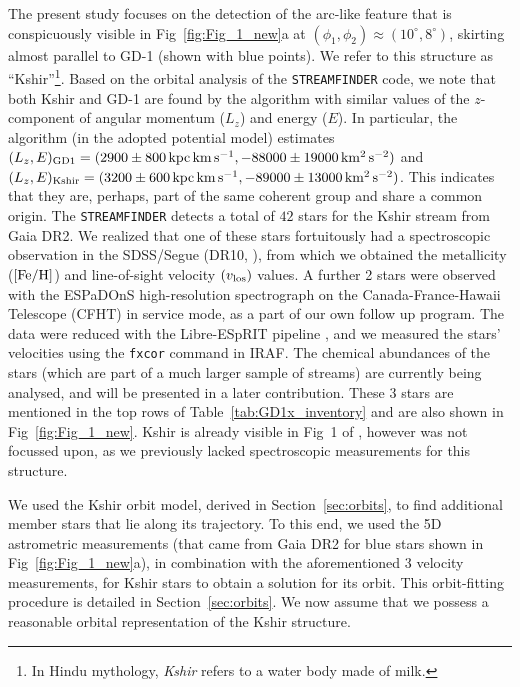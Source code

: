 \documentclass[apj]{emulateapj}
\def\km{{\rm\,km}}
\def\kms{{\rm\,km\,s^{-1}}}
\def\km2s2{{\rm\,km^{2}\,s^{-2}}}
\def\kpc{{\rm\,kpc}}
\def\deg{^\circ}
\begin{document}
The present study focuses on the detection of the arc-like feature that is conspicuously visible in Fig~\ref{fig:Fig_1_new}a at $(\phi_1,\phi_2) \approx (10\deg,8\deg)$, skirting almost parallel to GD-1 (shown with blue points). We refer to this structure as ``Kshir''\footnote{In Hindu mythology, {\it Kshir} refers to a water body made of milk.}. Based on the orbital analysis of the \texttt{STREAMFINDER} code, we note that both Kshir and GD-1 are found by the algorithm with similar values of the $z$-component of angular momentum ($L_z$) and energy ($E$). In particular, the algorithm (in the adopted potential model) estimates $(L_z, E)_{\rm GD1}=(2900\pm800\kpc\kms, -88000\pm19000\km2s2)$ and $(L_z, E)_{\rm Kshir}=(3200\pm600\kpc\kms, -89000\pm13000\km2s2)$. This indicates that they are, perhaps, part of the same coherent group and share a common origin. The \texttt{STREAMFINDER} detects a total of $42$ stars for the Kshir stream from Gaia DR2. We realized that one of these stars fortuitously had a spectroscopic observation in the SDSS/Segue (DR10, \citealt{SEGUE_SDSS2009}), from which we obtained the metallicity (${\rm [Fe/H]}$) and line-of-sight velocity $(v_{\rm los})$ values. A further 2 stars were observed with the ESPaDOnS high-resolution spectrograph on the Canada-France-Hawaii Telescope (CFHT) in service mode, as a part of our own follow up program. The data were reduced with the Libre-ESpRIT pipeline \citep{1997MNRAS.291..658D}, and we measured the stars' velocities using the {\tt fxcor} command in IRAF. The chemical abundances of the stars (which are part of a much larger sample of streams) are currently being analysed, and will be presented in a later contribution. These $3$ stars are mentioned in the top rows of Table~\ref{tab:GD1x_inventory} and are also shown in Fig~\ref{fig:Fig_1_new}. Kshir is already visible in Fig~1 of \cite{MalhanCocoonDetection2019}, however was not focussed upon, as we previously lacked spectroscopic measurements for this structure.


We used the Kshir orbit model, derived in Section~\ref{sec:orbits}, to find additional member stars that lie along its trajectory. To this end, we used the 5D astrometric measurements (that came from Gaia DR2 for blue stars shown in Fig~\ref{fig:Fig_1_new}a), in combination with the aforementioned $3$ velocity measurements, for Kshir stars to obtain a solution for its orbit. This orbit-fitting procedure is detailed in Section~\ref{sec:orbits}. We now assume that we possess a reasonable orbital representation of the Kshir structure.
\end{document}
